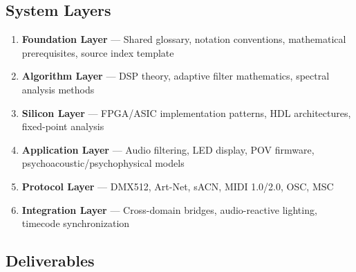 \documentclass[11pt,letterpaper]{article}
\begin{document}
\subsection{System Layers}

\begin{enumerate}[leftmargin=2em]
\item \textbf{Foundation Layer} --- Shared glossary, notation conventions, mathematical prerequisites, source index template
\item \textbf{Algorithm Layer} --- DSP theory, adaptive filter mathematics, spectral analysis methods
\item \textbf{Silicon Layer} --- FPGA/ASIC implementation patterns, HDL architectures, fixed-point analysis
\item \textbf{Application Layer} --- Audio filtering, LED display, POV firmware, psychoacoustic/psychophysical models
\item \textbf{Protocol Layer} --- DMX512, Art-Net, sACN, MIDI 1.0/2.0, OSC, MSC
\item \textbf{Integration Layer} --- Cross-domain bridges, audio-reactive lighting, timecode synchronization
\end{enumerate}

\subsection{Deliverables}
\end{document}
